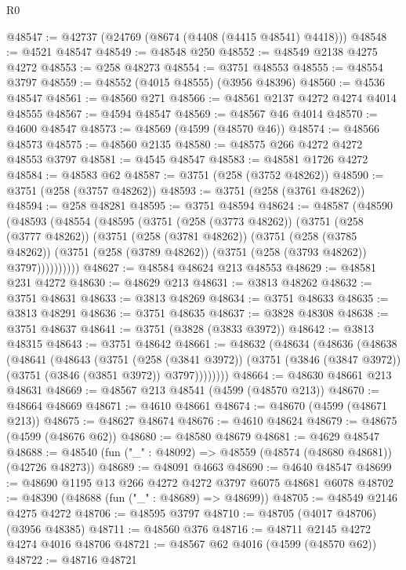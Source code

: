 \begin{lexlean}{R0}
\begin{coremodule}
@48547 := @42737 (@24769 (@8674 (@4408 (@4415 @48541) @4418)))
@48548 := @4521 @48547
@48549 := @48548 @250
@48552 := @48549 @2138 @4275 @4272
@48553 := @258 @48273
@48554 := @3751 @48553
@48555 := @48554 @3797
@48559 := @48552 (@4015 @48555) (@3956 @48396)
@48560 := @4536 @48547
@48561 := @48560 @271
@48566 := @48561 @2137 @4272 @4274 @4014 @48555
@48567 := @4594 @48547
@48569 := @48567 @46 @4014
@48570 := @4600 @48547
@48573 := @48569 (@4599 (@48570 @46))
@48574 := @48566 @48573
@48575 := @48560 @2135
@48580 := @48575 @266 @4272 @4272 @48553 @3797
@48581 := @4545 @48547
@48583 := @48581 @1726 @4272
@48584 := @48583 @62
@48587 := @3751 (@258 (@3752 @48262))
@48590 := @3751 (@258 (@3757 @48262))
@48593 := @3751 (@258 (@3761 @48262))
@48594 := @258 @48281
@48595 := @3751 @48594
@48624 := @48587
    (@48590
      (@48593
        (@48554
          (@48595
            (@3751
              (@258 (@3773 @48262))
              (@3751
                (@258 (@3777 @48262))
                (@3751
                  (@258 (@3781 @48262))
                  (@3751
                    (@258 (@3785 @48262))
                    (@3751 (@258 (@3789 @48262)) (@3751 (@258 (@3793 @48262)) @3797))))))))))
@48627 := @48584 @48624 @213 @48553
@48629 := @48581 @231 @4272
@48630 := @48629 @213
@48631 := @3813 @48262
@48632 := @3751 @48631
@48633 := @3813 @48269
@48634 := @3751 @48633
@48635 := @3813 @48291
@48636 := @3751 @48635
@48637 := @3828 @48308
@48638 := @3751 @48637
@48641 := @3751 (@3828 (@3833 @3972))
@48642 := @3813 @48315
@48643 := @3751 @48642
@48661 := @48632
    (@48634
      (@48636
        (@48638
          (@48641
            (@48643
              (@3751
                (@258 (@3841 @3972))
                (@3751 (@3846 (@3847 @3972)) (@3751 (@3846 (@3851 @3972)) @3797))))))))
@48664 := @48630 @48661 @213 @48631
@48669 := @48567 @213 @48541 (@4599 (@48570 @213))
@48670 := @48664 @48669
@48671 := @4610 @48661
@48674 := @48670 (@4599 (@48671 @213))
@48675 := @48627 @48674
@48676 := @4610 @48624
@48679 := @48675 (@4599 (@48676 @62))
@48680 := @48580 @48679
@48681 := @4629 @48547
@48688 := @48540 (fun ("_" : @48092) => @48559 (@48574 (@48680 @48681)) (@42726 @48273))
@48689 := @48091 @4663
@48690 := @4640 @48547
@48699 := @48690 @1195 @13 @266 @4272 @4272 @3797 @6075 @48681 @6078
@48702 := @48390 (@48688 (fun ("_" : @48689) => @48699))
@48705 := @48549 @2146 @4275 @4272
@48706 := @48595 @3797
@48710 := @48705 (@4017 @48706) (@3956 @48385)
@48711 := @48560 @376
@48716 := @48711 @2145 @4272 @4274 @4016 @48706
@48721 := @48567 @62 @4016 (@4599 (@48570 @62))
@48722 := @48716 @48721

\end{coremodule}
\end{lexlean}
